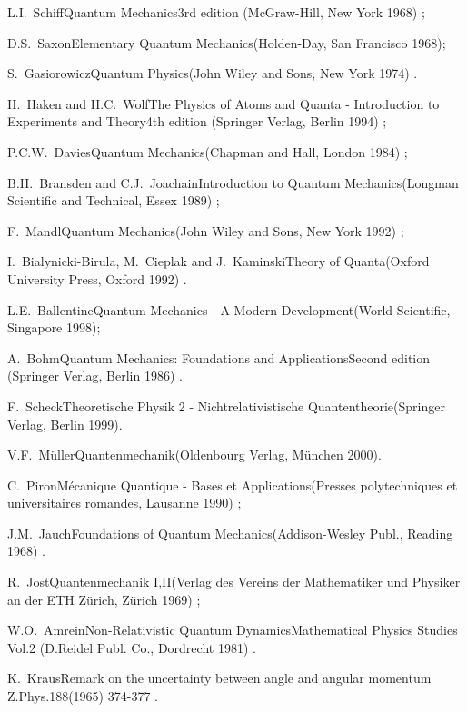 \documentclass[a4wide,12pt]{report}
\begin{document}
\begin{thebibliography}{22}
\bookref
{L.I.~Schiff}{Quantum Mechanics}{3rd edition
(McGraw-Hill, New York 1968) ;}
 
\bookref
{D.S.~Saxon}{Elementary Quantum Mechanics}{(Holden-Day, San Francisco
1968);}
 
\bookref
{S.~Gasiorowicz}{Quantum Physics}{(John Wiley and Sons, New York
1974) .}

 
\bookref
{H.~Haken and H.C.~Wolf}{The Physics of Atoms and Quanta - Introduction
to Experiments and Theory}{4th edition
(Springer Verlag, Berlin 1994) ;}
 
\bookref
{P.C.W.~Davies}{Quantum Mechanics}{(Chapman and Hall, London 1984) ;}
 
\bookref
{B.H.~Bransden and C.J.~Joachain}{Introduction to Quantum
Mechanics}{(Longman Scientific and Technical, Essex 1989) ;}
 
\bookref
{F.~Mandl}{Quantum Mechanics}{(John Wiley and Sons, New York 1992) ;}
  
\bookref
{I.~Bialynicki-Birula, M.~Cieplak and J.~Kaminski}{Theory of Quanta}{(Oxford 
University Press, Oxford 1992) .}


\bookref
{L.E.~Ballentine}{Quantum Mechanics - A Modern Development}{(World
Scientific, Singapore 1998);}
 
\bookref
{A.~Bohm}{Quantum Mechanics: Foundations and Applications}{Second
edition (Springer Verlag, Berlin 1986) .}


\bookref
{F.~Scheck}{Theoretische Physik 2 - Nichtrelativistische 
Quantentheorie}{(Springer Verlag, 
Berlin  1999).}


\bookref
{V.F.~M\"uller}{Quantenmechanik}{(Oldenbourg Verlag, 
M\"unchen 2000).}

 
\bookref
{C.~Piron}{M\'ecanique Quantique - Bases et Applications}{(Presses
polytechniques et universitaires romandes, Lausanne 1990) ;}
 
\bookref
{J.M.~Jauch}{Foundations of Quantum Mechanics}{(Addison-Wesley Publ.,
Reading 1968) .}

 
\bookref
{R.~Jost}{Quantenmechanik I,II}{(Verlag des Vereins der Mathematiker
und Physiker an der ETH Z\"urich, Z\"urich 1969) ;}
 
\bookref
{W.O.~Amrein}{Non-Relativistic Quantum Dynamics}{Mathematical
Physics Studies Vol.2 (D.Reidel Publ. Co., Dordrecht 1981) .}


\artref
{K.~Kraus}{Remark on the uncertainty between angle and angular momentum}{
Z.Phys.}{188}{(1965) 374-377 .}



\end{thebibliography}
\end{document}
